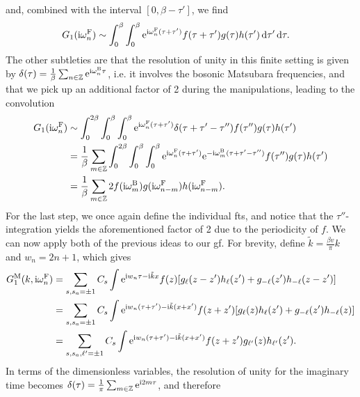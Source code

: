 and, combined with the interval $[0,\beta-\tau']$, we find
\begin{align*}
G_1(\text{i}\omega_n^{\text{F}}) &\sim \int_{0}^{\beta} \int_{0}^{\beta} \text{e}^{\text{i} \omega_n^{\text{F}}(\tau + \tau')} f(\tau + \tau') g(\tau) h(\tau') \,\mathrm{d}\tau'  \,\mathrm{d}\tau.
\end{align*}
The other subtleties are that the resolution of unity in this finite setting is given by $\delta(\tau) = \frac{1}{\beta} \sum_{n\in\mathbb{Z}} \text{e}^{\text{i}\omega_n^{\text{B}}\tau}$, i.e. it involves the bosonic Matsubara frequencies, and that we pick up an additional factor of 2 during the manipulations, leading to the convolution
\begin{align*}
G_1(\text{i}\omega_n^{\text{F}}) &\sim \int_0^{2\beta} \int_0^\beta \int_0^\beta \text{e}^{\text{i} \omega_n^{\text{F}}(\tau + \tau')} \delta(\tau + \tau' - \tau'') f(\tau'') g(\tau) h(\tau')\\
&= \frac{1}{\beta} \sum_{m\in\mathbb{Z}} \int_0^{2\beta} \int_0^\beta \int_0^\beta \text{e}^{\text{i} \omega_n^{\text{F}}(\tau + \tau')} \text{e}^{-\text{i}\omega_m^{\text{B}} (\tau + \tau' - \tau'')} f(\tau'') g(\tau) h(\tau')\\
&= \frac{1}{\beta} \sum_{m\in\mathbb{Z}} 2f(\text{i}\omega_m^{\text{B}}) g(\text{i}\omega_{n-m}^{\text{F}}) h(\text{i}\omega_{n-m}^{\text{F}}).
\end{align*}
For the last step, we once again define the individual \glspl{ft}, and notice that the $\tau''$-integration yields the aforementioned factor of 2 due to the periodicity of $f$.
We can now apply both of the previous ideas to our \gls{gf}.
For brevity, define $\tilde{k} = \frac{\beta v}{\pi} k$ and $w_n = 2n+1$, which gives
\begin{align*}
G^\M_1(k,\i\omega_n^\F) &= \sum_{s,s_a=\pm 1} C_s \int \powe{\i w_n \tau - \i \tilde{k} x} f(z) \klb*{g_\ell(z-z') h_\ell(z') + g_{-\ell}(z') h_{-\ell} (z-z')}\\
&= \sum_{s,s_a=\pm 1} C_s \int \powe{\i w_n (\tau + \tau') - \i \tilde{k} (x+x')} f(z+z') \klb*{g_\ell(z) h_\ell(z') + g_{-\ell}(z') h_{-\ell} (z)}\\
&= \sum_{s,s_a,\ell'=\pm 1} C_s \int \powe{\i w_n (\tau+\tau') - \i \tilde{k} (x+x')} f(z+z') g_{\ell'}(z) h_{\ell'}(z').
\end{align*}
In terms of the dimensionless variables, the resolution of unity for the imaginary time becomes $\delta(\tau) = \frac{1}{\pi} \sum_{m\in\mathbb{Z}} \text{e}^{\text{i} 2m\tau}$, and therefore
